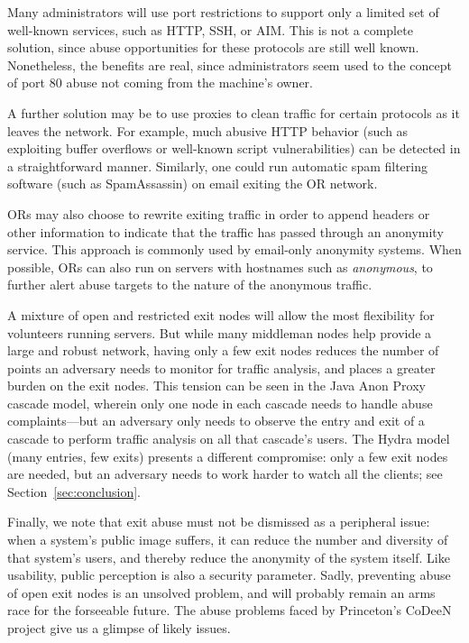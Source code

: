 \documentclass[times,10pt,twocolumn]{article}
\begin{document}

Many administrators will use port restrictions to support only a
limited set of well-known services, such as HTTP, SSH, or AIM.
This is not a complete solution, since abuse opportunities for these
protocols are still well known. Nonetheless, the benefits are real,
since administrators seem used to the concept of port 80 abuse not
coming from the machine's owner.

A further solution may be to use proxies to clean traffic for certain
protocols as it leaves the network.  For example, much abusive HTTP
behavior (such as exploiting buffer overflows or well-known script
vulnerabilities) can be detected in a straightforward manner.
Similarly, one could run automatic spam filtering software (such as
SpamAssassin) on email exiting the OR network.

ORs may also choose to rewrite exiting traffic in order to append
headers or other information to indicate that the traffic has passed
through an anonymity service.  This approach is commonly used
by email-only anonymity systems.  When possible, ORs can also
run on servers with hostnames such as {\it anonymous}, to further
alert abuse targets to the nature of the anonymous traffic.

A mixture of open and restricted exit nodes will allow the most
flexibility for volunteers running servers. But while many
middleman nodes help provide a large and robust network,
having only a few exit nodes reduces the number of points
an adversary needs to monitor for traffic analysis, and places a
greater burden on the exit nodes.  This tension can be seen in the
Java Anon Proxy
cascade model, wherein only one node in each cascade needs to handle
abuse complaints---but an adversary only needs to observe the entry
and exit of a cascade to perform traffic analysis on all that
cascade's users. The Hydra model (many entries, few exits) presents a
different compromise: only a few exit nodes are needed, but an
adversary needs to work harder to watch all the clients; see
Section~\ref{sec:conclusion}.

Finally, we note that exit abuse must not be dismissed as a peripheral
issue: when a system's public image suffers, it can reduce the number
and diversity of that system's users, and thereby reduce the anonymity
of the system itself.  Like usability, public perception is also a
security parameter.  Sadly, preventing abuse of open exit nodes is an
unsolved problem, and will probably remain an arms race for the
forseeable future.  The abuse problems faced by Princeton's CoDeeN
project \cite{darkside} give us a glimpse of likely issues.
\end{document}
